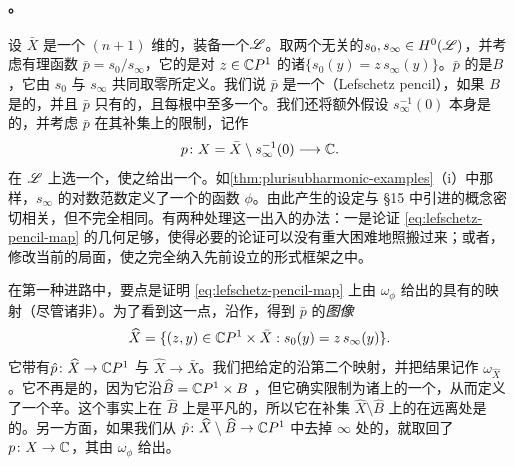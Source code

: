 \paragraph{\trLefschetzPencil{}。}\label{sub:lefschetz-pencils}
设 $\bar{X}$ 是一个 $(n+1)$ 维的\trSmooth{}\trProjectiveVariety，装备一个\trAmple{}\trLineBundle{}$\mathscr{L}$。取两个\trLinear{}无关的\trSection{}$s_0,s_\infty\in H^0(\mathscr{L})$，并考虑有理函数 $\bar{p}=s_0/s_\infty$，它的\trFiber{}是对 $z\in\mathbb{C}P^1$ 的诸\trHypersurface{}$\{s_0(y)=z\,s_\infty(y)\}$。$\bar{p}$ 的\trIndeterminacyLocus{}是\trBaseLocus{}$B$，它由 $s_0$ 与 $s_\infty$ 共同取零所定义。我们说 $\bar{p}$ 是一个\textbf{\trLefschetzPencil}（Lefschetz pencil），如果 $B$ 是\trSmooth{}的，并且 $\bar{p}$ 只有\trNondegenerate{}的\trCriticalPoint，且每根\trFiber{}中至多一个。我们还将额外假设 $s_\infty^{-1}(0)$ 本身是\trSmooth{}的，并考虑 $\bar{p}$ 在其补集上的限制，记作
\begin{equation}\label{eq:lefschetz-pencil-map}
p\colon X=\bar{X}\setminus s_\infty^{-1}(0)\longrightarrow\mathbb{C}.
\end{equation}
在 $\mathscr{L}$ 上选一个\trMetric，使之给出一个\trKaehler{}\trForm。如\cref{thm:plurisubharmonic-examples}（i）中那样，$s_\infty$ 的对数范数定义了一个\trFiniteType{}的\trPlurisubharmonic{}函数 $\phi$。由此产生的设定与 §15 中引进的\trExact\trLefschetzFibration{}概念密切相关，但不完全相同。有两种处理这一出入的办法：一是论证 \eqref{eq:lefschetz-pencil-map} 的几何足够\trWellBehaved，使得必要的论证可以没有重大困难{}地照搬过来；或者，修改当前的局面，使之完全纳入先前设立的形式框架之中。

在第一种进路中，要点是证明 \eqref{eq:lefschetz-pencil-map} 上由 $\omega_\phi$ 给出的\trConnection{}具有\trWellBehaved{}的\trParallelTransport{}映射（尽管诸\trFiber{}非\trCompact）。为了看到这一点，沿\trBaseLocus{}作\trBlowup，得到 $\bar{p}$ 的\emph{图像}
\begin{equation*}
\widehat{X}=\{(z,y)\in\mathbb{C}P^1\times\bar{X}: s_0(y)=z\,s_\infty(y)\}.
\end{equation*}
它带有\trProjection{}$\hat{p}\colon\widehat{X}\to\mathbb{C}P^1$ 与 $\widehat{X}\to\bar{X}$。我们把给定的\trKaehler{}\trForm{}沿第二个映射\trPullback，并把结果记作 $\omega_{\widehat{X}}$。它不再是\trKaehler{}的，因为它沿\trExceptionalDivisor{}$\widehat{B}=\mathbb{C}P^1\times B$ \trDegenerate，但它确实限制为诸\trSmooth\trFiber{}上的一个\trKaehler{}\trForm，从而定义了一个辛\trConnection。这个\trConnection{}事实上在 $\widehat{B}$ 上是平凡的，所以它在补集 $\widehat{X}\setminus\widehat{B}$ 上的\trParallelTransport{}在远离\trSingularPoint{}处是\trWellDefined{}的。另一方面，如果我们从 $\hat{p}\colon\widehat{X}\setminus\widehat{B}\to\mathbb{C}P^1$ 中去掉 $\infty$ 处的\trFiber，就取回了 $p\colon X\to\mathbb{C}$，其\trConnection{}由 $\omega_\phi$ 给出。

